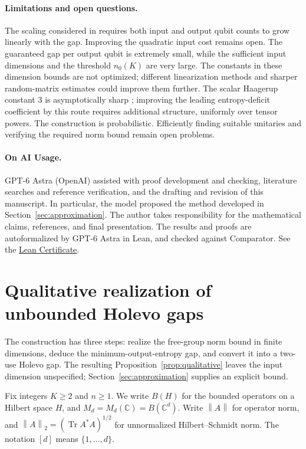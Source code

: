 \documentclass[11pt]{article}
\numberwithin{equation}{section}
\theoremstyle{boldremark}\newtheorem{remark}[theorem]{Remark}
\DeclareMathOperator{\Tr}{Tr}
\newcommand{\C}{\mathbb C}
\newcommand{\M}{M}
\newcommand{\norm}[1]{\left\lVert #1\right\rVert}
\begin{document}
\paragraph{Limitations and open questions.}
The scaling considered in \cite[Section~2, Eq.~(11)]{HP} requires both input and
output qubit counts to grow linearly with the
gap. Improving the quadratic input cost remains open.
The guaranteed gap per output qubit is extremely small, while the
sufficient input dimensions and the threshold $n_0(K)$ are very large.
The constants in these dimension bounds are not optimized; different
linearization methods and sharper random-matrix estimates could improve
them further.
The scalar Haagerup constant $3$ is asymptotically sharp
\cite[Section~7]{ZZCW}; improving the leading entropy-deficit
coefficient by this route requires additional structure, uniformly
over tensor powers.
The construction is probabilistic. Efficiently finding suitable unitaries and
verifying the required norm bound remain open problems.

\paragraph{On AI Usage.}
GPT-6 Astra (OpenAI) assisted with proof development and checking,
literature searches and reference verification, and the drafting and
revision of this manuscript. In particular, the model proposed the
method developed in Section~\ref{sec:approximation}. The author takes
responsibility for the mathematical claims, references, and final
presentation. The results and proofs are autoformalized by GPT-6 Astra in Lean, and checked against Comparator. See the \href{https://github.com/JWang226/Holevo-Additivity-Gap}{Lean Certificate}.

\section{Qualitative realization of unbounded Holevo gaps}
\label{sec:entropy}

The construction has three steps: realize the free-group norm bound
in finite dimensions, deduce the minimum-output-entropy gap, and
convert it into a two-use Holevo gap. The resulting
Proposition~\ref{prop:qualitative} leaves the input dimension
unspecified; Section~\ref{sec:approximation} supplies an explicit bound.

Fix integers $K\ge2$ and $n\ge1$. We write $B(H)$ for the bounded
operators on a Hilbert space $H$, and $\M_d=\M_d(\C)=B(\C^d)$.
Write $\norm A$ for operator norm,
and $\norm A_2=(\Tr A^*A)^{1/2}$ for unnormalized Hilbert--Schmidt norm.
The notation $[d]$ means $\{1,\ldots,d\}$.
\end{document}
